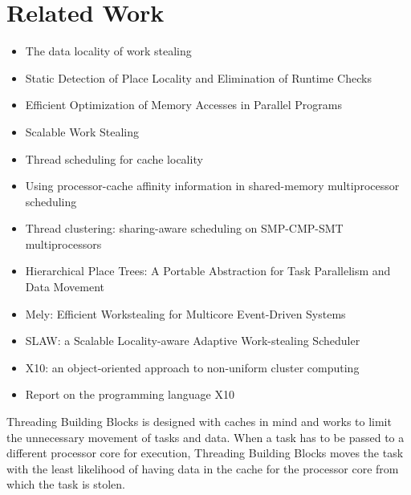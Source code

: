 
\chapter{Related Work}
\label{chap:locality-related-work}

\begin{itemize}
\item[\textbullet] The data locality of work stealing \cite{Acar2002}
\item[\textbullet] Static Detection of Place Locality and Elimination
  of Runtime Checks \cite{Agarwal2008}
\item[\textbullet] Efficient Optimization of Memory Accesses in
  Parallel Programs \cite{Barik2009}
\item[\textbullet] Scalable Work Stealing \cite{Dinan2009}
\item[\textbullet] Thread scheduling for cache locality \cite{Philbin1996}
\item[\textbullet] Using processor-cache affinity information in
  shared-memory multiprocessor scheduling \cite{Squillante1993}
\item[\textbullet] Thread clustering: sharing-aware scheduling on
  SMP-CMP-SMT multiprocessors \cite{Tam2007}
\item[\textbullet] Hierarchical Place Trees: A Portable Abstraction
  for Task Parallelism and Data Movement \cite{Yan2009}
\item[\textbullet] Mely: Efficient Workstealing for Multicore
  Event-Driven Systems \cite{Gaud2010}
\item[\textbullet] SLAW: a Scalable Locality-aware Adaptive
  Work-stealing Scheduler \cite{Guo2010}
\item[\textbullet] X10: an object-oriented approach to non-uniform
  cluster computing \cite{Charles2005}
\item[\textbullet] Report on the programming language X10
  \cite{Saraswat2010}
\end{itemize}

Threading Building Blocks is designed with caches in mind and works to
limit the unnecessary movement of tasks and data. When a task has to
be passed to a different processor core for execution, Threading
Building Blocks moves the task with the least likelihood of having
data in the cache for the processor core from which the task is
stolen.


